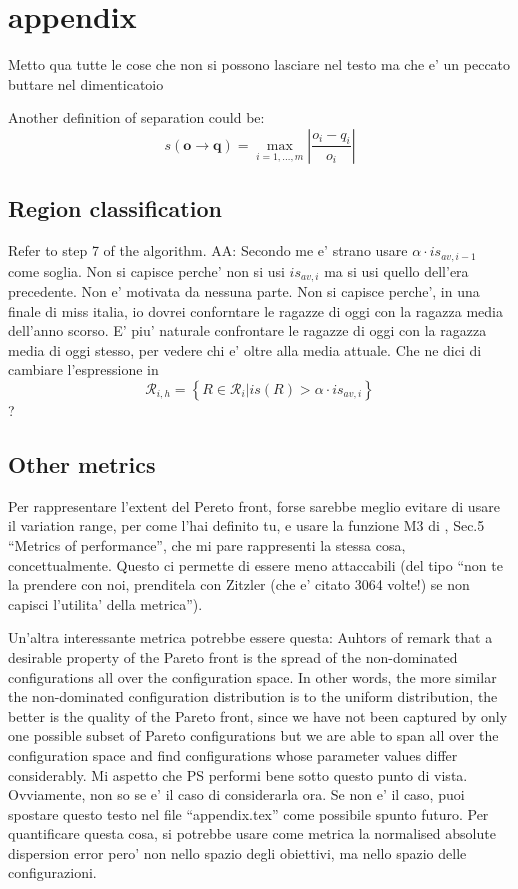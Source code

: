 \section{appendix}
Metto qua tutte le cose che non si possono lasciare nel testo ma che e' un peccato buttare nel dimenticatoio

\begin{definition} Another definition of separation could be:
	\[
	s\left(\mathbf{o}\rightarrow\mathbf{q}\right)=\max_{i=1,\dots,m}\left|\frac{o_{i}-q_{i}}{o_{i}}\right|
	\]
\end{definition}



\subsection{Region classification}
Refer to step 7 of the algorithm.
AA: Secondo me e' strano usare $\alpha\cdot is_{av,i-1}$ come soglia. Non si capisce perche' non si usi $is_{av,i}$ ma si usi quello dell'era precedente. Non e' motivata da nessuna parte. Non si capisce perche', in una finale di miss italia, io dovrei conforntare le ragazze di oggi con la ragazza media dell'anno scorso. E' piu' naturale confrontare le ragazze di oggi con la ragazza media di oggi stesso, per vedere chi e' oltre alla media attuale. Che ne dici di cambiare l'espressione in 
			\[
			\mathcal{R}_{i,h}=\left\{ \left.R\in\mathcal{R}_{i}\right|is\left(R\right)>\alpha\cdot is_{av,i}\right\} 
			\]
?

\subsection{Other metrics}
Per rappresentare l'extent del Pereto front, forse
sarebbe meglio evitare di usare il variation range, per come l'hai
definito tu, e usare la funzione M3 di \cite{zitzler_ec00}, Sec.5
``Metrics of performance'', che mi pare rappresenti la stessa cosa,
concettualmente. Questo ci permette di essere meno attaccabili (del
tipo ``non te la prendere con noi, prenditela con Zitzler (che e'
citato 3064 volte!) se non capisci l'utilita' della metrica'').


Un'altra interessante metrica potrebbe essere questa: Auhtors of \cite{zitzler_ec00} remark that a desirable property of the Pareto front is the spread of the non-dominated configurations all over the configuration space. In other words, the more similar the non-dominated configuration distribution is to the uniform distribution, the better is the quality of the Pareto front, since we have not been captured by only one possible subset of Pareto configurations but we are able to span all over the configuration space and find configurations whose parameter values differ considerably. Mi aspetto che PS performi bene sotto questo punto di vista. Ovviamente, non so se e' il caso di considerarla ora. Se non e' il caso, puoi spostare questo testo nel file ``appendix.tex'' come possibile spunto futuro. Per quantificare questa cosa, si potrebbe usare come metrica la normalised absolute dispersion error pero' non nello spazio degli obiettivi, ma nello spazio delle configurazioni.


